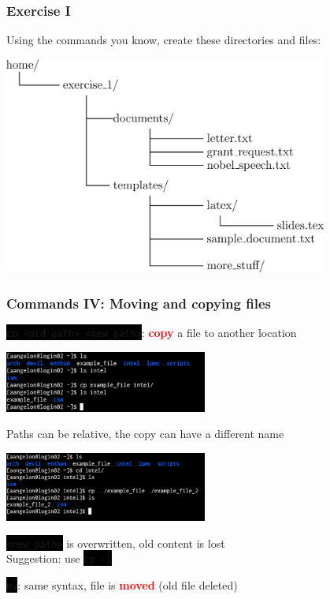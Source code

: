 \documentclass[unknownkeysallowed, 10pt, a4 paper, handout]{beamer}
\newcommand{\focus}[1]{\textbf{\textcolor{red}{#1}}}
\newcommand{\code}[1]{\colorbox{black}{\color{green}\texttt{#1}}}
\begin{document}
\begin{frame}[c]
  \begin{center}
    \frametitle{Exercise I}
    Using the commands you know, create these directories and files:

    \begin{center}
      \includegraphics[width=0.80\textwidth]{pics/exercise_1.eps}
    \end{center}
  \end{center}
\end{frame}

\begin{frame}[c]
  \begin{center}
    \frametitle{Commands IV: Moving and copying files}

    \code{cp <old\_path> <new\_path>}: \focus{copy} a file to another location
    \vspace{-3mm}

    \begin{center}
      \includegraphics[width=0.50\textwidth]{pics/cp_1.png}
    \end{center}

    Paths can be relative, the copy can have a different name\\
    \vspace{-1mm}

    \begin{center}
      \includegraphics[width=0.50\textwidth]{pics/cp_2.png}
    \end{center}

    \code{<new\_path>} is overwritten, old content is lost\\
    Suggestion: use \code{cp -i}

    \code{mv}: same syntax, file is \focus{moved} (old file deleted)
  \end{center}
\end{frame}
\end{document}
